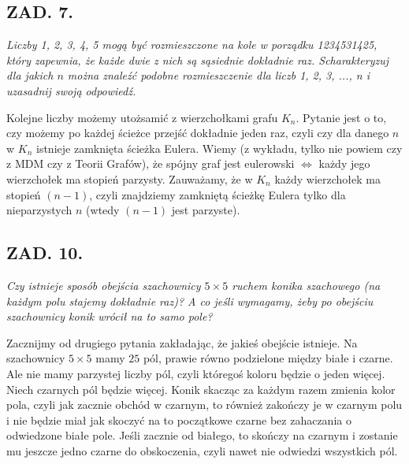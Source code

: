 \documentclass{article}
\begin{document}



\subsection*{ZAD. 7.}
\emph{Liczby 1, 2, 3, 4, 5 mogą być rozmieszczone na kole w porządku 1234531425, który zapewnia, że każde dwie z nich są sąsiednie dokładnie raz. Scharakteryzuj dla jakich $n$ można znaleźć podobne rozmieszczenie dla liczb 1, 2, 3, ..., n i uzasadnij swoją odpowiedź.}
\medskip

\medskip

Kolejne liczby możemy utożsamić z wierzchołkami grafu $K_n$. Pytanie jest o to, czy możemy po każdej ścieżce przejść dokładnie jeden raz, czyli czy dla danego $n$ w $K_n$ istnieje zamknięta ścieżka Eulera. Wiemy (z wykładu, tylko nie powiem czy z MDM czy z Teorii Grafów), że spójny graf jest eulerowski $\iff$ każdy jego wierzchołek ma stopień parzysty. Zauważamy, że w $K_n$ każdy wierzchołek ma stopień $(n-1)$, czyli znajdziemy zamkniętą ścieżkę Eulera tylko dla nieparzystych $n$ (wtedy $(n-1)$ jest parzyste).

\subsection*{ZAD. 10.}
\emph{Czy istnieje sposób obejścia szachownicy $5\times5$ ruchem konika szachowego (na każdym polu stajemy dokładnie raz)? A co jeśli wymagamy, żeby po obejściu szachownicy konik wrócił na to samo pole?}
\medskip

\medskip

Zacznijmy od drugiego pytania zakładając, że jakieś obejście istnieje. Na szachownicy $5\times5$ mamy $25$ pól, prawie równo podzielone między białe i czarne. Ale nie mamy parzystej liczby pól, czyli któregoś koloru będzie o jeden więcej. Niech czarnych pól będzie więcej. Konik skacząc za każdym razem zmienia kolor pola, czyli jak zacznie obchód w czarnym, to również zakończy je w czarnym polu i nie będzie miał jak skoczyć na to początkowe czarne bez zahaczania o odwiedzone białe pole. Jeśli zacznie od białego, to skończy na czarnym i zostanie mu jeszcze jedno czarne do obskoczenia, czyli nawet nie odwiedzi wszystkich pól.
\medskip
\end{document}
